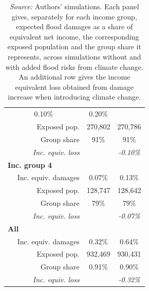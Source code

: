 \documentclass[12pt]{article}
\newcommand\fnote[1]{\captionsetup{justification=raggedright,singlelinecheck=false}\caption*{#1}}
\begin{document}
\begin{table}[htbp!]
\begin{tabular}{lll}
\multicolumn{1}{c}{0.10\%} &
\multicolumn{1}{c}{0.20\%}\\
\multicolumn{1}{r}{$\quad$ Exposed pop.} &
\multicolumn{1}{c}{270,802} &
\multicolumn{1}{c}{270,786}\\
\multicolumn{1}{r}{$\quad$ Group share} &
\multicolumn{1}{c}{91\%} &
\multicolumn{1}{c}{91\%}\\
\multicolumn{1}{r}{$\quad$ \textit{Inc. equiv. loss}} &
\multicolumn{1}{c}{\cellcolor{gray!25}} &
\multicolumn{1}{c}{\textit{-0.10\%}}\\
\cline{1-3}
\multicolumn{1}{l}{\textbf{Inc. group 4}} &
\multicolumn{1}{c}{} &
\multicolumn{1}{c}{}\\
\multicolumn{1}{r}{$\quad$ Inc. equiv. damages} &
\multicolumn{1}{c}{0.07\%} &
\multicolumn{1}{c}{0.13\%}\\
\multicolumn{1}{r}{$\quad$ Exposed pop.} &
\multicolumn{1}{c}{128,747} &
\multicolumn{1}{c}{128,642}\\
\multicolumn{1}{r}{$\quad$ Group share} &
\multicolumn{1}{c}{79\%} &
\multicolumn{1}{c}{79\%}\\
\multicolumn{1}{r}{$\quad$ \textit{Inc. equiv. loss}} &
\multicolumn{1}{c}{\cellcolor{gray!25}} &
\multicolumn{1}{c}{\textit{-0.07\%}}\\
\cline{1-3}
\multicolumn{1}{l}{\textbf{All}} &
\multicolumn{1}{c}{} &
\multicolumn{1}{c}{}\\
\multicolumn{1}{r}{$\quad$ Inc. equiv. damages} &
\multicolumn{1}{c}{0.32\%} &
\multicolumn{1}{c}{0.64\%}\\
\multicolumn{1}{r}{$\quad$ Exposed pop.} &
\multicolumn{1}{c}{932,469} &
\multicolumn{1}{c}{930,431}\\
\multicolumn{1}{r}{$\quad$ Group share} &
\multicolumn{1}{c}{0.91\%} &
\multicolumn{1}{c}{0.90\%}\\
\multicolumn{1}{r}{$\quad$ \textit{Inc. equiv. loss}} &
\multicolumn{1}{c}{\cellcolor{gray!25}} &
\multicolumn{1}{c}{\textit{-0.32\%}}\\
\cline{1-3}
\end{tabular}
\fnote{\scriptsize{\textit{Source:} Authors' simulations. Each panel gives, separately for each income group, expected flood damages as a share of equivalent net income, the corresponding exposed population and the group share it represents, across simulations without and with added flood risks from climate change. An additional row gives the income equivalent loss obtained from damage increase when introducing climate change.}}
\end{table}
\end{document}
